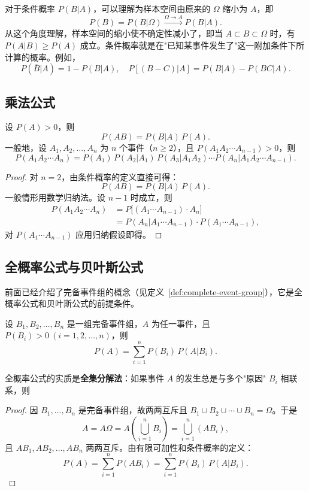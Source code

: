 \documentclass[lang=cn,11pt]{elegantbook}
\begin{document}
\begin{note}
对于条件概率 \(P(B|A)\)，可以理解为样本空间由原来的 \(\Omega\) 缩小为 \(A\)，即
\[
P(B) = P(B|\Omega) \xrightarrow{\Omega \to A} P(B|A).
\]
从这个角度理解，样本空间的缩小使不确定性减小了，即当 \(A \subset B \subset \Omega\) 时，有 \(P(A|B) \ge P(A)\) 成立。条件概率就是在"已知某事件发生了"这一附加条件下所计算的概率。例如，
\[
P(\overline{B}|A) = 1 - P(B|A), \quad P[(B-C)|A] = P(B|A) - P(BC|A).
\]
\end{note}

\subsection{乘法公式}

\begin{theorem}[乘法公式] \label{thm:multiplication}
设 \(P(A) > 0\)，则
\[
P(AB) = P(B|A)\,P(A).
\]
一般地，设 \(A_1, A_2, \dots, A_n\) 为 \(n\) 个事件（\(n \ge 2\)），且 \(P(A_1 A_2 \cdots A_{n-1}) > 0\)，则
\[
P(A_1 A_2 \cdots A_n) = P(A_1)\,P(A_2|A_1)\,P(A_3|A_1 A_2) \cdots P(A_n|A_1 A_2 \cdots A_{n-1}).
\]
\end{theorem}
\begin{proof}
对 \(n=2\)，由条件概率的定义直接可得：
\[
P(AB) = P(B|A)\,P(A).
\]
一般情形用数学归纳法。设 \(n-1\) 时成立，则
\begin{align*}
P(A_1 A_2 \cdots A_n) &= P\!\bigl[(A_1 \cdots A_{n-1}) \cdot A_n\bigr] \\
&= P(A_n | A_1 \cdots A_{n-1}) \cdot P(A_1 \cdots A_{n-1}),
\end{align*}
对 \(P(A_1 \cdots A_{n-1})\) 应用归纳假设即得。
\end{proof}

\subsection{全概率公式与贝叶斯公式}

前面已经介绍了完备事件组的概念（见定义~\ref{def:complete-event-group}），它是全概率公式和贝叶斯公式的前提条件。

\begin{theorem}[全概率公式] \label{thm:total-probability}
设 \(B_1, B_2, \dots, B_n\) 是一组完备事件组，\(A\) 为任一事件，且 \(P(B_i) > 0\ (i=1,2,\dots,n)\)，则
\[
P(A) = \sum_{i=1}^{n} P(B_i)\,P(A|B_i).
\]
\end{theorem}

全概率公式的实质是\textbf{全集分解法}：如果事件 \(A\) 的发生总是与多个"原因" \(B_i\) 相联系，则
\begin{proof}
因 \(B_1, \dots, B_n\) 是完备事件组，故两两互斥且 \(B_1 \cup B_2 \cup \cdots \cup B_n = \Omega\)。于是
\[
A = A\Omega = A\!\left(\bigcup_{i=1}^{n} B_i\right) = \bigcup_{i=1}^{n} (AB_i),
\]
且 \(AB_1, AB_2, \dots, AB_n\) 两两互斥。由有限可加性和条件概率的定义：
\[
P(A) = \sum_{i=1}^{n} P(AB_i) = \sum_{i=1}^{n} P(B_i)\,P(A|B_i).
\]
\end{proof}
\end{document}

